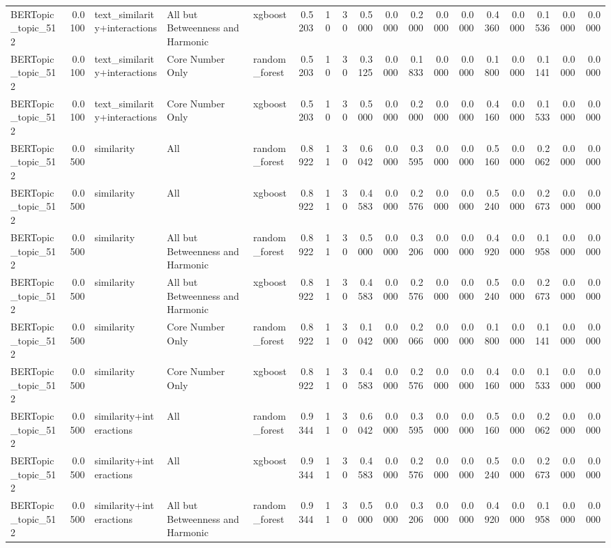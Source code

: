 \begin{tabular}{lrlllrrrrrrrrrrrrr}
BERTopic_topic_512 & 0.0100 & text_similarity+interactions & All but Betweenness and Harmonic & xgboost & 0.5203 & 10 & 30 & 0.5000 & 0.0000 & 0.2000 & 0.0000 & 0.0000 & 0.4360 & 0.0000 & 0.1536 & 0.0000 & 0.0000 \\
BERTopic_topic_512 & 0.0100 & text_similarity+interactions & Core Number Only & random_forest & 0.5203 & 10 & 30 & 0.3125 & 0.0000 & 0.1833 & 0.0000 & 0.0000 & 0.1800 & 0.0000 & 0.1141 & 0.0000 & 0.0000 \\
BERTopic_topic_512 & 0.0100 & text_similarity+interactions & Core Number Only & xgboost & 0.5203 & 10 & 30 & 0.5000 & 0.0000 & 0.2000 & 0.0000 & 0.0000 & 0.4160 & 0.0000 & 0.1533 & 0.0000 & 0.0000 \\
BERTopic_topic_512 & 0.0500 & similarity & All & random_forest & 0.8922 & 11 & 30 & 0.6042 & 0.0000 & 0.3595 & 0.0000 & 0.0000 & 0.5160 & 0.0000 & 0.2062 & 0.0000 & 0.0000 \\
BERTopic_topic_512 & 0.0500 & similarity & All & xgboost & 0.8922 & 11 & 30 & 0.4583 & 0.0000 & 0.2576 & 0.0000 & 0.0000 & 0.5240 & 0.0000 & 0.2673 & 0.0000 & 0.0000 \\
BERTopic_topic_512 & 0.0500 & similarity & All but Betweenness and Harmonic & random_forest & 0.8922 & 11 & 30 & 0.5000 & 0.0000 & 0.3206 & 0.0000 & 0.0000 & 0.4920 & 0.0000 & 0.1958 & 0.0000 & 0.0000 \\
BERTopic_topic_512 & 0.0500 & similarity & All but Betweenness and Harmonic & xgboost & 0.8922 & 11 & 30 & 0.4583 & 0.0000 & 0.2576 & 0.0000 & 0.0000 & 0.5240 & 0.0000 & 0.2673 & 0.0000 & 0.0000 \\
BERTopic_topic_512 & 0.0500 & similarity & Core Number Only & random_forest & 0.8922 & 11 & 30 & 0.1042 & 0.0000 & 0.2066 & 0.0000 & 0.0000 & 0.1800 & 0.0000 & 0.1141 & 0.0000 & 0.0000 \\
BERTopic_topic_512 & 0.0500 & similarity & Core Number Only & xgboost & 0.8922 & 11 & 30 & 0.4583 & 0.0000 & 0.2576 & 0.0000 & 0.0000 & 0.4160 & 0.0000 & 0.1533 & 0.0000 & 0.0000 \\
BERTopic_topic_512 & 0.0500 & similarity+interactions & All & random_forest & 0.9344 & 11 & 30 & 0.6042 & 0.0000 & 0.3595 & 0.0000 & 0.0000 & 0.5160 & 0.0000 & 0.2062 & 0.0000 & 0.0000 \\
BERTopic_topic_512 & 0.0500 & similarity+interactions & All & xgboost & 0.9344 & 11 & 30 & 0.4583 & 0.0000 & 0.2576 & 0.0000 & 0.0000 & 0.5240 & 0.0000 & 0.2673 & 0.0000 & 0.0000 \\
BERTopic_topic_512 & 0.0500 & similarity+interactions & All but Betweenness and Harmonic & random_forest & 0.9344 & 11 & 30 & 0.5000 & 0.0000 & 0.3206 & 0.0000 & 0.0000 & 0.4920 & 0.0000 & 0.1958 & 0.0000 & 0.0000 \\

\end{tabular}
